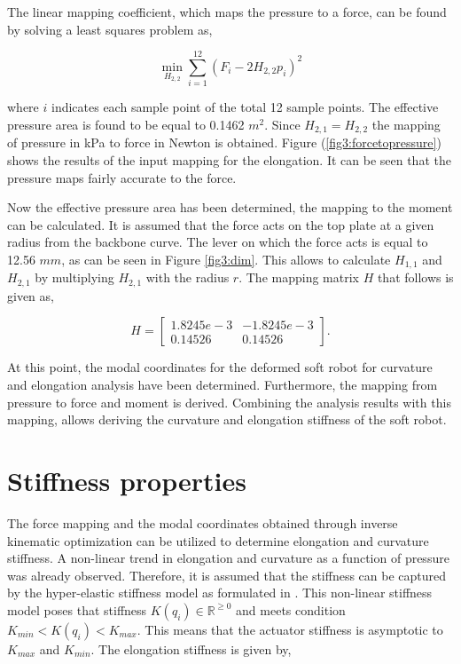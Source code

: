 The linear mapping coefficient, which maps the pressure to a force, can be found by solving a least squares problem as,

\begin{equation}
\min_{H_{2,2}} \sum_{i=1}^{12} (F_i - 2 H_{2,2} p_i)^2
\label{eq3:forcefitting}
\end{equation}

where $i$ indicates each sample point of the total 12 sample points. The effective pressure area is found to be equal to 0.1462 $m^2$. Since $H_{2,1} = H_{2,2}$ the mapping of pressure in kPa to force in Newton is obtained. Figure (\ref{fig3:forcetopressure}) shows the results of the input mapping for the elongation. It can be seen that the pressure maps fairly accurate to the force.

Now the effective pressure area has been determined, the mapping to the moment can be calculated. It is assumed that the force acts on the top plate at a given radius from the backbone curve. The lever on which the force acts is equal to 12.56 $mm$, as can be seen in Figure \ref{fig3:dim}. This allows to calculate $H_{1,1}$ and $H_{2,1}$ by multiplying $H_{2,1}$ with the radius $r$. The mapping matrix $H$ that follows is given as,

\begin{equation}
    H =  \begin{bmatrix} 1.8245e-3 & -1.8245e-3 \\
    0.14526 & 0.14526\end{bmatrix}.  
\end{equation}

At this point, the modal coordinates for the deformed soft robot for curvature and elongation analysis have been determined. Furthermore, the mapping from pressure to force and moment is derived. Combining the analysis results with this mapping, allows deriving the curvature and elongation stiffness of the soft robot. 




\section{Stiffness properties}

The force mapping and the modal coordinates obtained through inverse kinematic optimization can be utilized to determine elongation and curvature stiffness. A non-linear trend in elongation and curvature as a function of pressure was already observed. Therefore, it is assumed that the stiffness can be captured by the hyper-elastic stiffness model as formulated in \cite{Caasenbrood2020StiffnessModel}. This non-linear stiffness model poses that stiffness $K(q_i) \in \mathbb{R}^{\geq 0}$ and meets condition $K_{min} < K(q_i) < K_{max}$. This means that the actuator stiffness is asymptotic to $K_{max}$ and $K_{min}$.  The elongation stiffness is given by,

